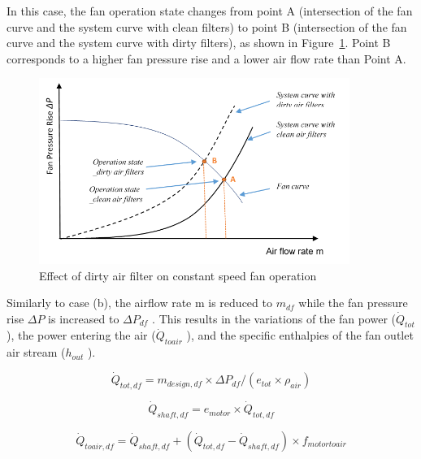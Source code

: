 In this case, the fan operation state changes from point A (intersection of the fan curve and the system curve with clean filters) to point B (intersection of the fan curve and the system curve with dirty filters), as shown in Figure~\ref{fig:effect-of-dirty-air-filter-on-constant-speed}. Point B corresponds to a higher fan pressure rise and a lower air flow rate than Point A.

\begin{figure}[hbtp] %
\centering
\includegraphics[width=0.9\textwidth, height=0.9\textheight, keepaspectratio=true]{media/image8008.png}
\caption{Effect of dirty air filter on constant speed fan operation \protect \label{fig:effect-of-dirty-air-filter-on-constant-speed}}
\end{figure}

Similarly to case (b), the airflow rate m is reduced to \(m_{df}\) while the fan pressure rise \(\Delta P\) is increased to \(\Delta P_{df}\) . This results in the variations of the fan power (\(\dot Q_{tot}\) ), the power entering the air (\(\dot Q_{toair}\) ), and the specific enthalpies of the fan outlet air stream (\(h_{out}\) ).

\begin{equation}
\dot{Q}_{tot,df} = m_{design,df} \times \Delta P_{df} / (e_{tot} \times \rho_{air} )
\end{equation}

\begin{equation}
\dot{Q}_{shaft,df} = e_{motor} \times \dot{Q}_{tot, df}
\end{equation}

\begin{equation}
\dot{Q}_{toair,df} = \dot{Q}_{shaft,df} +( \dot{Q}_{tot,df} - \dot{Q}_{shaft,df}) \times f_{motortoair}
\end{equation}

